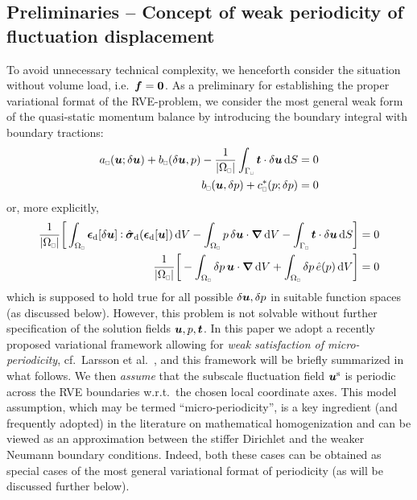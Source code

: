 \documentclass{bmcart}
\renewcommand{\dev}{\mathrm{d}}
\newcommand{\volume}{|\Omega_\rve|}
\newcommand{\rve}{
  {\mathchoice
   {\mbox{\scalebox{0.67}{$\Box$}}}
   {\mbox{\scalebox{0.67}{$\Box$}}}
   {\mbox{\scalebox{0.5}{$\Box$}}}
   {\mbox{\scalebox{0.375}{$\Box$}}}
  }
}
\begin{document}
\subsection{Preliminaries -- Concept of weak periodicity of fluctuation displacement}

To avoid unnecessary technical complexity, we henceforth consider the situation without volume load, i.e.\ $\boldsymbol{f}=\boldsymbol{0}$.
As a preliminary for establishing the proper variational format of the RVE-problem, we consider the most general weak form of the quasi-static momentum balance by introducing the boundary integral with boundary tractions:
\begin{subequations}
\begin{align}
    a_\rve(\ta{u};\delta\ta{u}) + b_\rve(\delta\ta{u},p) - \frac{1}{\volume}\int_{\Gamma_\rve} \ta{t}\cdot\delta\ta{u} \dif S &= 0
\label{eq19a} \\
    b_\rve(\ta{u},\delta p) + c^*_\rve(p;\delta p) &= 0
\label{eq19b}
\end{align}
\end{subequations}
or, more explicitly,
\begin{subequations}\label{eq20}
\begin{align}
    \frac{1}{\volume}\bigg[\int_{\Omega_\rve} \ts{\epsilon}_\dev[\delta\ta{u}]\dprod \hat{\ts{\sigma}}_\dev(\ts{\epsilon}_\dev[\ta{u}]) \dif V
    - \int_{\Omega_\rve} p\, \delta\ta{u}\cdot\diff \dif V
    - \int_{\Gamma_\rve} \ta{t}\cdot\delta\ta{u} \dif S\bigg] &= 0
\label{eq20a} \\
    \frac{1}{\volume}\bigg[-\int_{\Omega_\rve} \delta p\, \ta{u}\cdot\diff \dif V
    +  \int_{\Omega_\rve} \delta p\,\hat{e}(p) \dif V\bigg] &= 0
\label{eq20b}
\end{align}
\end{subequations}
which is supposed to hold true for all possible $\delta\boldsymbol{u}, \delta p$ in suitable function spaces (as discussed below).
However, this problem is not solvable without further specification of the solution fields $\boldsymbol{u}, p, \boldsymbol{t}$.
In this paper we adopt a recently proposed variational framework allowing for \emph{weak satisfaction of micro-periodicity}, cf.\  Larsson et al.\ \cite{larsson_computational_2011}, and this framework will be briefly summarized in what follows.
We then \emph{assume} that the subscale fluctuation field $\boldsymbol{u}^{\mathrm{s}}$ is periodic across the RVE boundaries w.r.t.\ the chosen local coordinate axes.
This model assumption, which may be termed ``micro-periodicity'', is a key ingredient (and frequently adopted) in the literature on mathematical homogenization and can be viewed as an approximation between the stiffer Dirichlet and the weaker Neumann boundary conditions.
Indeed, both these cases can be obtained as special cases of the most general variational format of periodicity (as will be discussed further below).
\end{document}
